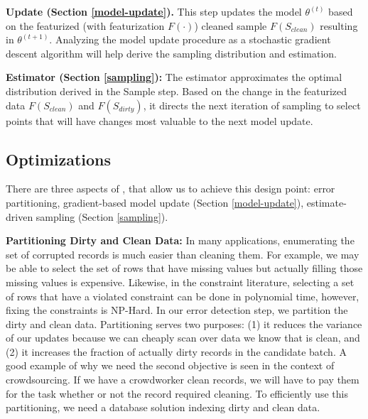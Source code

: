   \vspace{0.5em}

  \noindent\textbf{Update (Section \ref{model-update}). } This step updates the model $\theta^{(t)}$ based on the featurized (with featurization $F(\cdot)$) cleaned sample $F(S_{clean})$ resulting in $\theta^{(t+1)}$. Analyzing the model update procedure as a stochastic gradient descent algorithm will help derive the sampling distribution and estimation.

  \vspace{0.5em}

  \noindent\textbf{Estimator (Section \ref{sampling}): } The estimator approximates the optimal distribution derived in the Sample step. Based on the change in the featurized data $F(S_{clean})$ and $F(S_{dirty})$, it directs the next iteration of sampling to select points that will have changes most valuable to the next model update.


  \subsection{Optimizations}
  There are three aspects of \sys, that allow us to achieve this design point: error partitioning, gradient-based model update (Section \ref{model-update}), estimate-driven sampling (Section \ref{sampling}).

  \vspace{0.5em}

  \noindent\textbf{Partitioning Dirty and Clean Data: } In many applications, enumerating the set of corrupted records is much easier than cleaning them. For example, we may be able to select the set of rows that have missing values but actually filling those missing values is expensive. Likewise, in the constraint literature, selecting a set of rows that have a violated constraint can be done in polynomial time, however, fixing the constraints is NP-Hard.
  In our error detection step, we partition the dirty and clean data.
  Partitioning serves two purposes: (1) it reduces the variance of our updates because we can cheaply scan over data we know that is clean, and (2) it increases the fraction of actually dirty records in the candidate batch.
  A good example of why we need the second objective is seen in the context of crowdsourcing.
  If we have a crowdworker clean records, we will have to pay them for the task whether or not the record required cleaning.
  To efficiently use this partitioning, we need a database solution indexing dirty and clean data.

